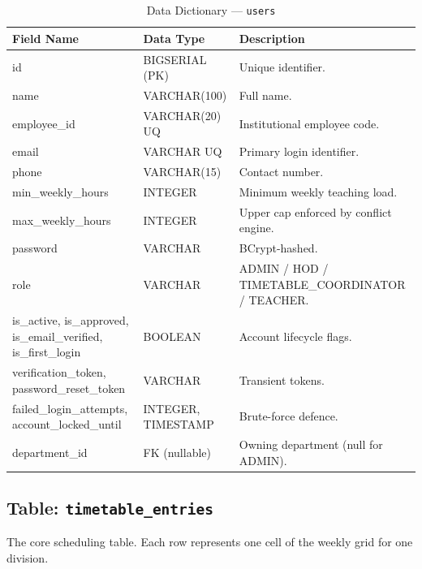 \begin{table}[H]
    \centering
    \renewcommand{\arraystretch}{1.5}
    \begin{tabular}{|p{3.5cm}|p{2.8cm}|p{7.2cm}|}
        \hline
        \textbf{Field Name} & \textbf{Data Type} & \textbf{Description} \\
        \hline
        id & BIGSERIAL (PK) & Unique identifier. \\
        \hline
        name & VARCHAR(100) & Full name. \\
        \hline
        employee\_id & VARCHAR(20) UQ & Institutional employee code. \\
        \hline
        email & VARCHAR UQ & Primary login identifier. \\
        \hline
        phone & VARCHAR(15) & Contact number. \\
        \hline
        min\_weekly\_hours & INTEGER & Minimum weekly teaching load. \\
        \hline
        max\_weekly\_hours & INTEGER & Upper cap enforced by conflict engine. \\
        \hline
        password & VARCHAR & BCrypt-hashed. \\
        \hline
        role & VARCHAR & ADMIN / HOD / TIMETABLE\_COORDINATOR / TEACHER. \\
        \hline
        is\_active, is\_approved, is\_email\_verified, is\_first\_login & BOOLEAN & Account lifecycle flags. \\
        \hline
        verification\_token, password\_reset\_token & VARCHAR & Transient tokens. \\
        \hline
        failed\_login\_attempts, account\_locked\_until & INTEGER, TIMESTAMP & Brute-force defence. \\
        \hline
        department\_id & FK (nullable) & Owning department (null for ADMIN). \\
        \hline
    \end{tabular}
    \caption{Data Dictionary --- \texttt{users}}
    \label{tab:dd_users}
\end{table}

\subsection{Table: \texttt{timetable\_entries}}
The core scheduling table. Each row represents one cell of the weekly grid for one division.

